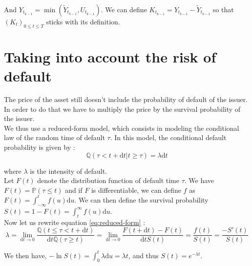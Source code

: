\documentclass[a4paper,11pt,english]{book}
\begin{document}
And $Y_{t_{k-1}}=\min(\widetilde{Y}_{t_{k-1}},U_{t_{k-1}})$. We can define $K_{t_{k-1}}=Y_{t_{k-1}}-\widetilde{Y}_{t_{k-1}}$ so that $(K_{t})_{0\leq t\leq T}$ sticks with its definition.

\newpage
\section{Taking into account the risk of default}
The price of the asset still doesn't include the probability of default of the issuer. In order to do that we have to multiply the price by the survival probability of the issuer.\\

We thus use a reduced-form model, which consists in modeling the conditional law of the random time of default $\tau$. In this model, the conditional default probability is given by :
\begin{equation}
    \mathbb{Q}(\tau<t+\text{d}t|t\geq \tau)=\lambda \text{d}t
    \label{eq:reduced-form}
\end{equation}


where $\lambda$ is the intensity of default.\\

Let $F(t)$ denote the distribution function of default time $\tau$. We have $F(t)=\mathbb{P}(\tau\leq t)$ and if $F$ is differentiable, we can define $f$ as $F(t)=\int_{-\infty}^{t}f(u)\text{d}u$.
We can then define the survival probability $S(t) = 1-F(t) = \int_{t}^{\infty}f(u)\text{d}u$.\\

Now let us rewrite equation \ref{eq:reduced-form} :
$$\lambda = \underset{\text{d}t\to 0}{\lim} \frac{\mathbb{Q}(t\leq \tau<t+\text{d}t)}{\text{d}t\mathbb{Q}(\tau\geq t)} = \underset{\text{d}t\to 0}{\lim} \frac{F(t+\text{d}t)-F(t)}{\text{d}t S(t)}=\frac{f(t)}{S(t)}=\frac{-S'(t)}{S(t)}$$

We then have, $-\ln{S(t)}=\int_{0}^{t}\lambda \text{d}u = \lambda t$, and thus $S(t)=e^{-\lambda t}$.
\end{document}
